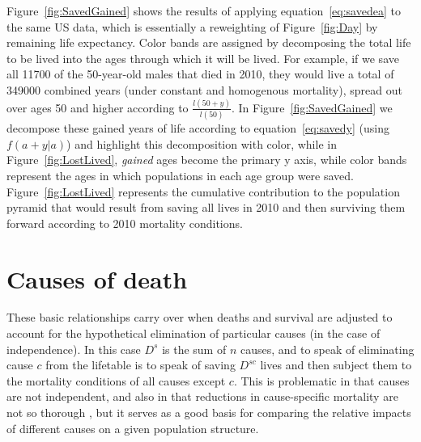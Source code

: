 \documentclass{article}
\begin{document}
Figure~\ref{fig:SavedGained} shows the results of applying
equation~\eqref{eq:savedea} to the same US data, which is essentially a
reweighting of Figure~\ref{fig:Day} by remaining life expectancy. Color bands
are assigned by decomposing the total life to be lived into the ages through
which it will be lived. For example, if we save all 11700 of the 50-year-old
males that died in 2010, they would live a total of 349000 combined years (under
constant and homogenous mortality), spread out over ages 50 and higher according
to $\frac{l(50+y)}{l(50)}$. In Figure~\ref{fig:SavedGained} we decompose these
gained years of life according to equation~\eqref{eq:savedy} (using $f(a+y|a)$)
and highlight this decomposition with color, while in Figure~\ref{fig:LostLived}, \textit{gained} ages become the primary y axis,
while color bands represent the ages in which populations in each age group were
saved. Figure~\ref{fig:LostLived} represents the cumulative contribution to the
population pyramid that would result from saving all lives in 2010 and then
surviving them forward according to 2010 mortality conditions.

\section*{Causes of death}

These basic relationships carry over when deaths and survival are adjusted to
account for the hypothetical elimination of particular causes (in the case of
independence). In this case $D^s$ is the sum of $n$ causes, and to speak of
eliminating cause $c$ from the lifetable is to speak of saving $D^{sc}$ lives and then
subject them to the mortality conditions of all causes except $c$.
This is problematic in that causes are not independent, and also in that
reductions in cause-specific mortality are not so thorough , but it serves as a
good basis for comparing the relative impacts of different causes on a given population structure.
\end{document}
